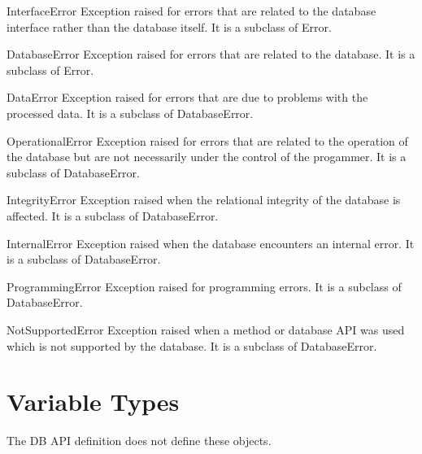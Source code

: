 \documentclass{manual}
\begin{document}
\begin{datadesc}{InterfaceError}
  Exception raised for errors that are related to the database interface rather
  than the database itself. It is a subclass of Error.
\end{datadesc}

\begin{datadesc}{DatabaseError}
  Exception raised for errors that are related to the database. It is a
  subclass of Error.
\end{datadesc}

\begin{datadesc}{DataError}
  Exception raised for errors that are due to problems with the processed data.
  It is a subclass of DatabaseError.
\end{datadesc}

\begin{datadesc}{OperationalError}
  Exception raised for errors that are related to the operation of the database
  but are not necessarily under the control of the progammer. It is a
  subclass of DatabaseError.
\end{datadesc}

\begin{datadesc}{IntegrityError}
  Exception raised when the relational integrity of the database is affected.
  It is a subclass of DatabaseError.
\end{datadesc}
 
\begin{datadesc}{InternalError}
  Exception raised when the database encounters an internal error.
  It is a subclass of DatabaseError.
\end{datadesc}
 
\begin{datadesc}{ProgrammingError}
  Exception raised for programming errors. It is a subclass of DatabaseError.
\end{datadesc}
 
\begin{datadesc}{NotSupportedError}
  Exception raised when a method or database API was used which is not
  supported by the database. It is a subclass of DatabaseError.
\end{datadesc}
 
\section{Variable Types}\label{vartypes}

 The DB API definition does not define these objects.
\end{document}
